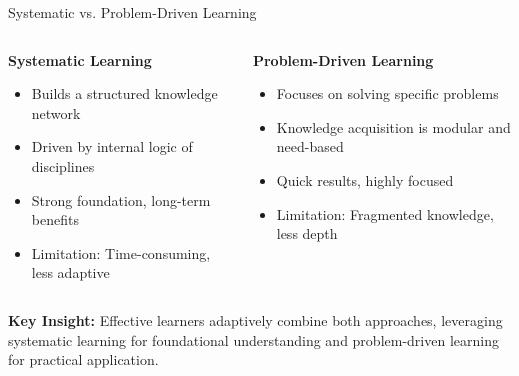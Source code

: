 \begin{frame}[fragile]{ Systematic vs. Problem-Driven Learning}
    \scriptsize
    \begin{columns}
        \begin{column}{0.5\textwidth}
            \textbf{Systematic Learning}
            \begin{itemize}
                \item Builds a structured knowledge network
                \item Driven by internal logic of disciplines
                \item Strong foundation, long-term benefits
                \item Limitation: Time-consuming, less adaptive
            \end{itemize}
        \end{column}
        \begin{column}{0.5\textwidth}
            \textbf{Problem-Driven Learning}
            \begin{itemize}
                \item Focuses on solving specific problems
                \item Knowledge acquisition is modular and need-based
                \item Quick results, highly focused
                \item Limitation: Fragmented knowledge, less depth
            \end{itemize}
        \end{column}
    \end{columns}
    \vspace{0.5cm}
    \textbf{Key Insight:} Effective learners adaptively combine both approaches, leveraging systematic learning for foundational understanding and problem-driven learning for practical application.
\end{frame}


